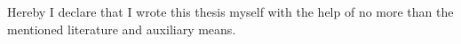 Hereby I declare that I wrote this thesis myself with the help of no more than the mentioned literature and auxiliary means.
